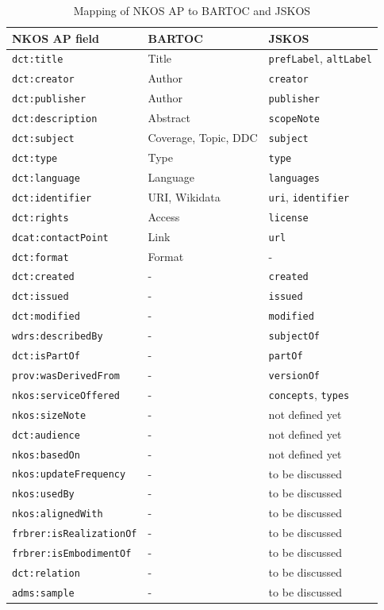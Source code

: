 \documentclass[12pt,a4paper]{llncs}
\begin{document}
\begin{table}\centering
\caption{Mapping of NKOS AP to BARTOC and JSKOS}
\label{tab:nkosap}
\begin{tabular}{lll}
NKOS AP field & BARTOC & JSKOS \\
\hline	
\verb|dct:title| 		& Title  	& \verb|prefLabel|, \verb|altLabel| \\
\verb|dct:creator| 		& Author 	& \verb|creator| \\
\verb|dct:publisher| 	& Author	& \verb|publisher| \\
\verb|dct:description| 	& Abstract  & \verb|scopeNote| \\
\verb|dct:subject| 		& Coverage, Topic, DDC & \verb|subject| \\
\verb|dct:type| 		& Type 		& \verb|type| \\
\verb|dct:language| 	& Language  & \verb|languages| \\
\verb|dct:identifier| 	& URI, Wikidata & \verb|uri|, \verb|identifier| \\
\verb|dct:rights| 		& Access 	& \verb|license| \\
\verb|dcat:contactPoint| & Link     & \verb|url| \\
\verb|dct:format| 		& Format	& - \\
\verb|dct:created|		& - 		& \verb|created| \\
\verb|dct:issued| 		& - 		& \verb|issued| \\
\verb|dct:modified|		& - 		& \verb|modified| \\
\verb|wdrs:describedBy| & -         & \verb|subjectOf| \\
\verb|dct:isPartOf| 		& - 	& \verb|partOf| \\
\verb|prov:wasDerivedFrom| & - 		& \verb|versionOf| \\
\verb|nkos:serviceOffered| & - 		& \verb|concepts|, \verb|types| \\
\verb|nkos:sizeNote| 	& - 		& not defined yet \\
\verb|dct:audience| & - 			& not defined yet \\
\verb|nkos:basedOn| 	& - 		& not defined yet \\
\verb|nkos:updateFrequency| & - 	& to be discussed \\
\verb|nkos:usedBy| & - 				& to be discussed \\
\verb|nkos:alignedWith| 	& -		& to be discussed \\
\verb|frbrer:isRealizationOf| & - 	& to be discussed \\
\verb|frbrer:isEmbodimentOf| & - 	& to be discussed \\
\verb|dct:relation| 		 & - 	& to be discussed \\
\verb|adms:sample| 			 & - 	& to be discussed \\
\hline
\end{tabular}


\end{table}
\end{document}
